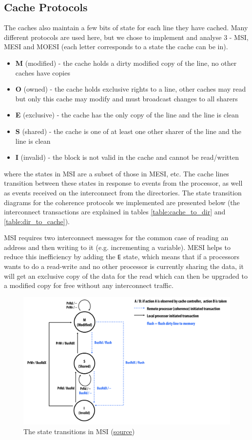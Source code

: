 \documentclass{article}
\def\inline{\lstinline[language=C++, basicstyle=\ttfamily]}
\begin{document}
\subsection{Cache Protocols}\label{subsec:protocols}
The caches also maintain a few bits of state for each line they have cached. Many different protocols are used here, but we chose to implement and analyse 3 - MSI, MESI and MOESI (each letter corresponds to a state the cache can be in).
\begin{itemize}
\itemsep 0em
    \item \textbf{M} (modified) - the cache holds a dirty modified copy of the line, no other caches have copies
    \item \textbf{O} (owned) - the cache holds exclusive rights to a line, other caches may read but only this cache may modify and must broadcast changes to all sharers
    \item \textbf{E} (exclusive) - the cache has the only copy of the line and the line is clean
    \item \textbf{S} (shared) - the cache is one of at least one other sharer of the line and the line is clean
    \item \textbf{I} (invalid) - the block is not valid in the cache and cannot be read/written
\end{itemize}
where the states in MSI are a subset of those in MESI, etc.  The cache lines transition between these states in response to events from the processor, as well as events received on the interconnect from the directories.  The state transition diagrams for the coherence protocols we implemented are presented below (the interconnect transactions are explained in tables \ref{table:cache_to_dir} and \ref{table:dir_to_cache}).

MSI requires two interconnect messages for the common case of reading an address and then writing to it (e.g. incrementing a variable). MESI helps to reduce this inefficiency by adding the \inline{E} state, which means that if a processors wants to do a read-write and no other processor is currently sharing the data, it will get an exclusive copy of the data for the read which can then be upgraded to a modified copy for free without any interconnect traffic.

\begin{figure}[H]
\centering
\includegraphics[width=.8\textwidth]{figures/msi.png}
\caption{The state transitions in MSI (\href{http://www.cs.cmu.edu/afs/cs/academic/class/15418-f20/public/lectures/10\_cachecoherence1.pdf}{source})}
\end{figure}
\end{document}
